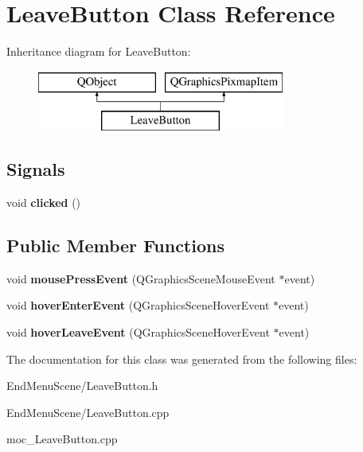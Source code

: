 \hypertarget{classLeaveButton}{}\section{Leave\+Button Class Reference}
\label{classLeaveButton}
Inheritance diagram for Leave\+Button\+:\begin{figure}[H]
\begin{center}
\leavevmode
\includegraphics[height=2.000000cm]{classLeaveButton}
\end{center}
\end{figure}
\subsection*{Signals}
\begin{DoxyCompactItemize}
\item 
void {\bfseries clicked} ()\hypertarget{classLeaveButton_a23c0fdc8ebbe3f2ce2a817e3587d634d}{}\label{classLeaveButton_a23c0fdc8ebbe3f2ce2a817e3587d634d}

\end{DoxyCompactItemize}
\subsection*{Public Member Functions}
\begin{DoxyCompactItemize}
\item 
void {\bfseries mouse\+Press\+Event} (Q\+Graphics\+Scene\+Mouse\+Event $\ast$event)\hypertarget{classLeaveButton_ae627a5bbcd17ae533b10efc57d80afe6}{}\label{classLeaveButton_ae627a5bbcd17ae533b10efc57d80afe6}

\item 
void {\bfseries hover\+Enter\+Event} (Q\+Graphics\+Scene\+Hover\+Event $\ast$event)\hypertarget{classLeaveButton_a7e3b2d000b0630daa8366e547a06e059}{}\label{classLeaveButton_a7e3b2d000b0630daa8366e547a06e059}

\item 
void {\bfseries hover\+Leave\+Event} (Q\+Graphics\+Scene\+Hover\+Event $\ast$event)\hypertarget{classLeaveButton_a709352208ac9bed883c40e417e4c13dd}{}\label{classLeaveButton_a709352208ac9bed883c40e417e4c13dd}

\end{DoxyCompactItemize}


The documentation for this class was generated from the following files\+:\begin{DoxyCompactItemize}
\item 
End\+Menu\+Scene/Leave\+Button.\+h\item 
End\+Menu\+Scene/Leave\+Button.\+cpp\item 
moc\+\_\+\+Leave\+Button.\+cpp\end{DoxyCompactItemize}
